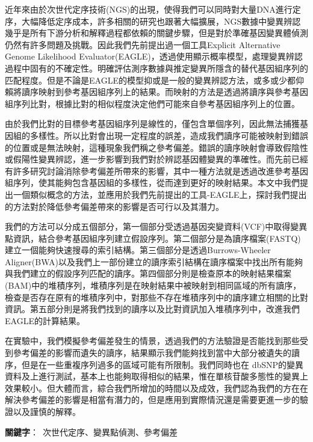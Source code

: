近年來由於次世代定序技術(NGS)的出現，使得我們可以同時對大量DNA進行定序，大幅降低定序成本，許多相關的研究也跟著大幅擴展，NGS數據中變異辨認幾乎是所有下游分析和解釋過程都依賴的關鍵步驟，但是對於準確基因變異體偵測仍然有許多問題及挑戰。因此我們先前提出過一個工具Explicit Alternative Genome Likelihood Evaluator(EAGLE)，透過使用顯示概率模型，處理變異辨認過程中固有的不確定性。明確評估測序數據與推定變異所隱含的替代基因組序列的匹配程度。但是不論是EAGLE的模型抑或是一般的變異辨認方法，或多或少都仰賴將讀序映射到參考基因組序列上的結果。而映射的方法是透過將讀序與參考基因組序列比對，根據比對的相似程度決定他們可能來自參考基因組序列上的位置。

由於我們比對的目標參考基因組序列是線性的，僅包含單個序列，因此無法捕獲基因組的多樣性。所以比對會出現一定程度的誤差，造成我們讀序可能被映射到錯誤的位置或是無法映射，這種現象我們稱之參考偏差。錯誤的讀序映射會導致假陰性或假陽性變異辨認，進一步影響到我們對於辨認基因體變異的準確性。而先前已經有許多研究討論消除參考偏差所帶來的影響，其中一種方法就是透過改進參考基因組序列，使其能夠包含基因組的多樣性，從而達到更好的映射結果。本文中我們提出一個類似概念的方法，並應用於我們先前提出的工具-EAGLE上，探討我們提出的方法對於降低參考偏差帶來的影響是否可行以及其潛力。

我們的方法可以分成五個部分，第一個部分受透過基因突變資料(VCF)中取得變異點資訊，結合參考基因組序列建立假設序列。第二個部分是為讀序檔案(FASTQ)建立一個能夠快速搜尋的索引結構。第三個部分是透過Burrows-Wheeler Aligner(BWA)以及我們上一部份建立的讀序索引結構在讀序檔案中找出所有能夠與我們建立的假設序列匹配的讀序。第四個部分則是檢查原本的映射結果檔案(BAM)中的堆積序列，堆積序列是在映射結果中被映射到相同區域的所有讀序，檢查是否存在原有的堆積序列中，對那些不存在堆積序列中的讀序建立相關的比對資訊。第五部分則是將我們找到的讀序以及比對資訊加入堆積序列中，改進我們EAGLE的計算結果。

在實驗中，我們模擬參考偏差發生的情景，透過我們的方法驗證是否能找到那些受到參考偏差的影響而遺失的讀序，結果顯示我們能夠找到當中大部分被遺失的讀序，但是在一些重複序列過多的區域可能有所限制。我們同時也在 dbSNP的變異資料及上進行測試，基本上也能夠取得相似的結果，惟在單核苷酸多態性的變異上效果較小。但大體而言，綜合我們所增加的時間以及成效，我們認為我們的方在在解決參考偏差的影響是相當有潛力的，但是應用到實際情況還是需要更進一步的驗證以及謹慎的解釋。

\begin{flushleft}
\mbox{{\bf 關鍵字}： 次世代定序、變異點偵測、參考偏差 }
\end{flushleft}
